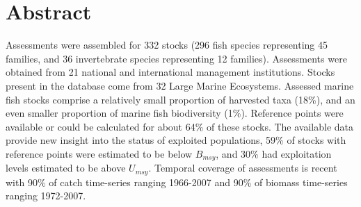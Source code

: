 \section*{Abstract}

Assessments were assembled for 332 stocks
(296 fish species representing
45 families, and 36
invertebrate species representing 12
families). Assessments were obtained from 21 national
and international management institutions. Stocks
present in the database come from 32 Large
Marine Ecosystems. Assessed marine fish stocks
comprise a relatively small proportion of harvested taxa
(18\%), and an even smaller proportion of
marine fish biodiversity (1\%). Reference
points were available or could be calculated for about
64\% of these stocks. The available data
provide new insight into the status of exploited populations,
59\% of stocks with reference points
were estimated to be below $B_{msy}$, and
30\% had exploitation levels
estimated to be above $U_{msy}$. Temporal coverage of assessments is
recent with 90\% of catch time-series ranging 1966-2007
and 90\% of biomass time-series ranging 1972-2007.


